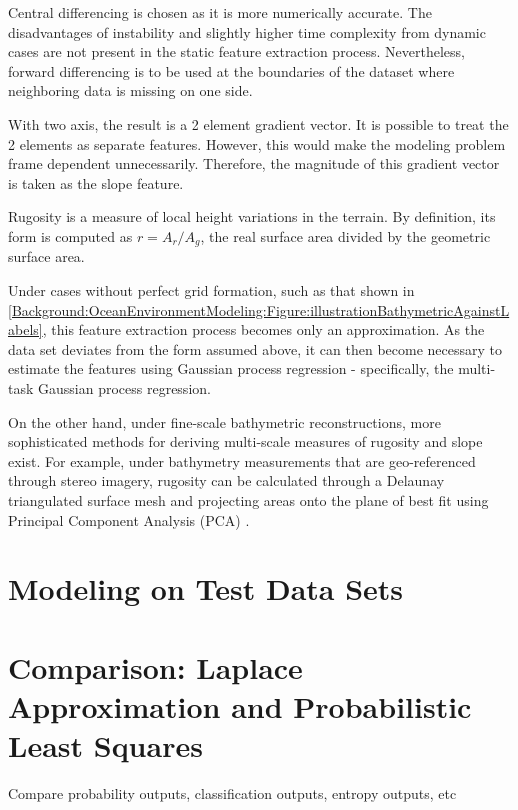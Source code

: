			Central differencing is chosen as it is more numerically accurate. The disadvantages of instability and slightly higher time complexity from dynamic cases are not present in the static feature extraction process. Nevertheless, forward differencing is to be used at the boundaries of the dataset where neighboring data is missing on one side.
						
			With two axis, the result is a 2 element gradient vector. It is possible to treat the 2 elements as separate features. However, this would make the modeling problem frame dependent unnecessarily. Therefore, the magnitude of this gradient vector is taken as the slope feature. 
			
			Rugosity is a measure of local height variations in the terrain. By definition, its form is computed as $r = A_{r}/A_{g}$, the real surface area divided by the geometric surface area.
			
			Under cases without perfect grid formation, such as that shown in \cref{Background:OceanEnvironmentModeling:Figure:illustrationBathymetricAgainstLabels}, this feature extraction process becomes only an approximation. As the data set deviates from the form assumed above, it can then become necessary to estimate the features using Gaussian process regression - specifically, the multi-task Gaussian process regression. 
			
		 	On the other hand, under fine-scale bathymetric reconstructions, more sophisticated methods for deriving multi-scale measures of rugosity and slope exist. For example, under bathymetry measurements that are geo-referenced through stereo imagery, rugosity can be calculated through a Delaunay triangulated surface mesh and projecting areas onto the plane of best fit using Principal Component Analysis (PCA) \citep{StefanWilliams:Rugosity}.
							
			\FloatBarrier
				
	\section{Modeling on Test Data Sets}
	
	\section{Comparison: Laplace Approximation and Probabilistic Least Squares}
	
		Compare probability outputs, classification outputs, entropy outputs, etc
	
